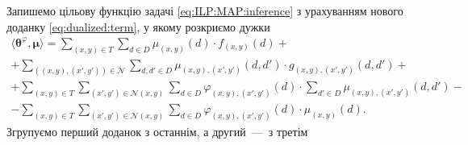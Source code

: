 Запишемо цільову функцію задачі \eqref{eq:ILP:MAP:inference}
з урахуванням нового доданку \eqref{eq:dualized:term}, у якому розкриємо дужки
\begin{equation*}
\begin{gathered}
    \langle \pmb{\theta}^{\varphi}, \pmb{\mu} \rangle =
    \sum \limits_{\left(x, y \right) \in T}
        \sum \limits_{d \in D}
            \mu_{\left(x, y \right)} \left(d \right) \cdot
            f_{\left(x, y \right)} \left( d \right) + \\
    + \sum \limits_{\left(\left(x, y \right), \left(x', y' \right) \right) \in \mathcal{N}}
        \sum \limits_{d, d' \in D}
            \mu_{\left(x, y \right), \left(x', y' \right)} \left(
                d, d'
            \right) \cdot
            g_{\left(x, y \right), \left(x', y' \right)} \left(
                d, d'
            \right) + \\
    + \sum \limits_{\left(x, y \right) \in T}
        \sum \limits_{\left(x', y' \right) \in \mathcal{N} \left(x, y \right)}
            \sum \limits_{d \in D}
                \varphi_{\left(x, y \right), \left(x', y' \right)} \left(
                    d
                \right) \cdot
                \sum \limits_{d' \in D}
                    \mu_{\left(x, y \right), \left(x', y' \right)} \left(
                        d, d'
                    \right) - \\
    - \sum \limits_{\left(x, y \right) \in T}
        \sum \limits_{\left(x', y' \right) \in \mathcal{N}\left(x, y \right)}
            \sum \limits_{d \in D}
                \varphi_{\left(x, y \right), \left(x', y' \right)} \left(
                    d
                \right) \cdot \mu_{\left(x, y \right)} \left(d \right).
\end{gathered}
\end{equation*}
Згрупуємо перший доданок з останнім, а другий~---~з третім

